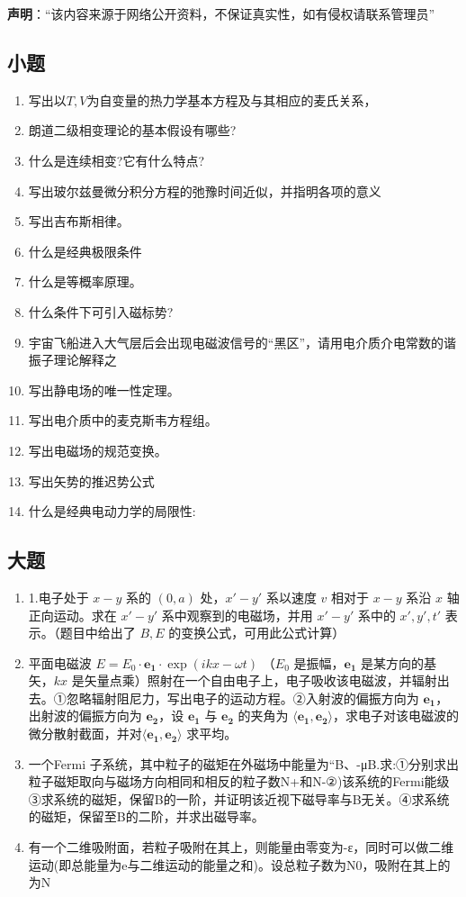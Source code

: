 
\textbf{声明}：“该内容来源于网络公开资料，不保证真实性，如有侵权请联系管理员”
\subsection{小题}
\begin{enumerate}
\item 写出以$T,V$为自变量的热力学基本方程及与其相应的麦氏关系，
\item 朗道二级相变理论的基本假设有哪些?
\item 什么是连续相变?它有什么特点?
\item 写出玻尔兹曼微分积分方程的弛豫时间近似，并指明各项的意义
\item 写出吉布斯相律。
\item 什么是经典极限条件
\item 什么是等概率原理。
\item 什么条件下可引入磁标势?
\item 宇宙飞船进入大气层后会出现电磁波信号的“黑区”，请用电介质介电常数的谐振子理论解释之
\item 写出静电场的唯一性定理。
\item 写出电介质中的麦克斯韦方程组。
\item 写出电磁场的规范变换。
\item 写出矢势的推迟势公式
\item 什么是经典电动力学的局限性:
\end{enumerate}
\subsection{大题}
\begin{enumerate}
\item 1.电子处于 $x-y$ 系的 $(0, a)$ 处，$x'-y'$ 系以速度 $v$ 相对于 $x-y$ 系沿 $x$ 轴正向运动。求在 $x'-y'$ 系中观察到的电磁场，并用 $x'-y'$ 系中的 $x', y', t'$ 表示。（题目中给出了 $B, E$ 的变换公式，可用此公式计算）
\item 平面电磁波 $E = E_0 \cdot \mathbf{e_1} \cdot \exp(ikx - \omega t)$ （$E_0$ 是振幅，$\mathbf{e_1}$ 是某方向的基矢，$kx$ 是矢量点乘）照射在一个自由电子上，电子吸收该电磁波，并辐射出去。①忽略辐射阻尼力，写出电子的运动方程。②入射波的偏振方向为 $\mathbf{e_1}$，出射波的偏振方向为 $\mathbf{e_2}$，设 $\mathbf{e_1}$ 与 $\mathbf{e_2}$ 的夹角为 $\langle \mathbf{e_1}, \mathbf{e_2} \rangle$，求电子对该电磁波的微分散射截面，并对$\langle\mathbf{e_1}, \mathbf{e_2} \rangle$ 求平均。
\item 一个Fermi 子系统，其中粒子的磁矩在外磁场中能量为“B、-μB.求:①分别求出粒子磁矩取向与磁场方向相同和相反的粒子数N+和N-②)该系统的Fermi能级③求系统的磁矩，保留B的一阶，并证明该近视下磁导率与B无关。④求系统的磁矩，保留至B的二阶，并求出磁导率。
\item 有一个二维吸附面，若粒子吸附在其上，则能量由零变为-ε，同时可以做二维运动(即总能量为e与二维运动的能量之和)。设总粒子数为N0，吸附在其上的为N
\end{enumerate}
